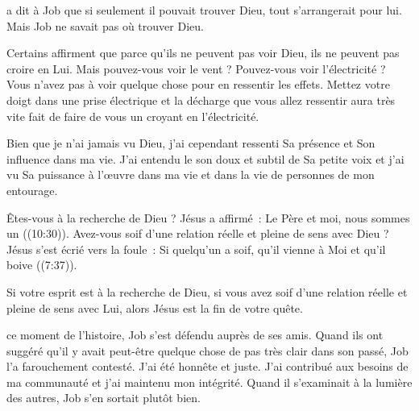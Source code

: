  a dit à Job que si seulement il pouvait trouver Dieu,
 tout s'arrangerait pour lui. Mais Job ne savait pas où trouver Dieu.

Certains affirment que parce qu'ils ne peuvent pas voir Dieu,
 ils ne peuvent pas croire en Lui. Mais pouvez-vous voir le vent ?
 Pouvez-vous voir l'électricité ?
 Vous n'avez pas à voir quelque chose pour en ressentir les effets.
 Mettez votre doigt dans une prise électrique et la décharge
 que vous allez ressentir aura très vite fait de faire de vous
 un \og croyant \fg{} en l'électricité.

Bien que je n'ai jamais vu Dieu, j'ai cependant ressenti Sa présence
 et Son influence dans ma vie.
 J'ai entendu le son doux et subtil de Sa petite voix
 et j'ai vu Sa puissance à l'œuvre dans ma vie
 et dans la vie de personnes de mon entourage.

Êtes-vous à la recherche de Dieu ? Jésus a affirmé~:
 \og Le Père et moi, nous sommes un \fg{} ((10:30)).
 Avez-vous soif d'une relation réelle et pleine de sens avec Dieu ?
 Jésus s'est écrié vers la foule~:
 \og Si quelqu'un a soif, qu'il vienne à Moi et qu'il boive \fg{}
 ((7:37)).

Si votre esprit est à la recherche de Dieu, si vous avez soif
 d'une relation réelle et pleine de sens avec Lui,
 alors Jésus est la fin de votre quête.


\dvrule







 ce moment de l'histoire,
 Job s'est défendu auprès de ses amis.
 Quand ils ont suggéré qu'il y avait peut-être quelque chose
 de pas très clair dans son passé, Job l'a farouchement contesté.
 \og J'ai été honnête et juste. J'ai contribué aux besoins de ma communauté
 et j'ai maintenu mon intégrité. \fg{}
 Quand il s'examinait à la lumière des autres, Job s'en sortait plutôt bien.


